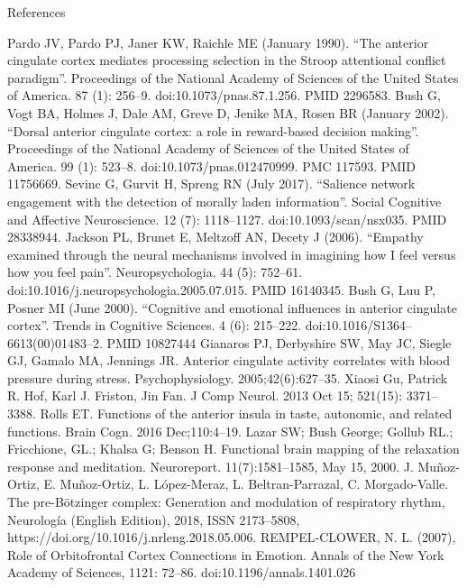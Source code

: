 \documentclass[twocolumn]{article}
\begin{document}
\pagebreak


References







Pardo JV, Pardo PJ, Janer KW, Raichle ME (January 1990). “The anterior cingulate cortex mediates processing selection in the Stroop attentional conflict paradigm”. Proceedings of the National Academy of Sciences of the United States of America. 87 (1): 256–9. doi:10.1073/pnas.87.1.256. PMID 2296583.
Bush G, Vogt BA, Holmes J, Dale AM, Greve D, Jenike MA, Rosen BR (January 2002). “Dorsal anterior cingulate cortex: a role in reward-based decision making”. Proceedings of the National Academy of Sciences of the United States of America. 99 (1): 523–8. doi:10.1073/pnas.012470999. PMC 117593. PMID 11756669.
Sevinc G, Gurvit H, Spreng RN (July 2017). “Salience network engagement with the detection of morally laden information”. Social Cognitive and Affective Neuroscience. 12 (7): 1118–1127. doi:10.1093/scan/nsx035. PMID 28338944.
Jackson PL, Brunet E, Meltzoff AN, Decety J (2006). “Empathy examined through the neural mechanisms involved in imagining how I feel versus how you feel pain”. Neuropsychologia. 44 (5): 752–61. doi:10.1016/j.neuropsychologia.2005.07.015. PMID 16140345.
Bush G, Luu P, Posner MI (June 2000). “Cognitive and emotional influences in anterior cingulate cortex”. Trends in Cognitive Sciences. 4 (6): 215–222. doi:10.1016/S1364–6613(00)01483–2. PMID 10827444
Gianaros PJ, Derbyshire SW, May JC, Siegle GJ, Gamalo MA, Jennings JR. Anterior cingulate activity correlates with blood pressure during stress. Psychophysiology. 2005;42(6):627–35.
Xiaosi Gu, Patrick R. Hof, Karl J. Friston, Jin Fan. J Comp Neurol. 2013 Oct 15; 521(15): 3371–3388.
Rolls ET. Functions of the anterior insula in taste, autonomic, and related functions. Brain Cogn. 2016 Dec;110:4–19.
Lazar SW; Bush George; Gollub RL.; Fricchione, GL.; Khalsa G; Benson H. Functional brain mapping of the relaxation response and meditation.
Neuroreport. 11(7):1581–1585, May 15, 2000.
J. Muñoz-Ortiz, E. Muñoz-Ortiz, L. López-Meraz, L. Beltran-Parrazal, C. Morgado-Valle. The pre-Bötzinger complex: Generation and modulation of respiratory rhythm, Neurología (English Edition), 2018, ISSN 2173–5808,
https://doi.org/10.1016/j.nrleng.2018.05.006.
REMPEL‐CLOWER, N. L. (2007), Role of Orbitofrontal Cortex Connections in
Emotion. Annals of the New York Academy of Sciences, 1121:
72–86. doi:10.1196/annals.1401.026


\pagebreak
\end{document}
